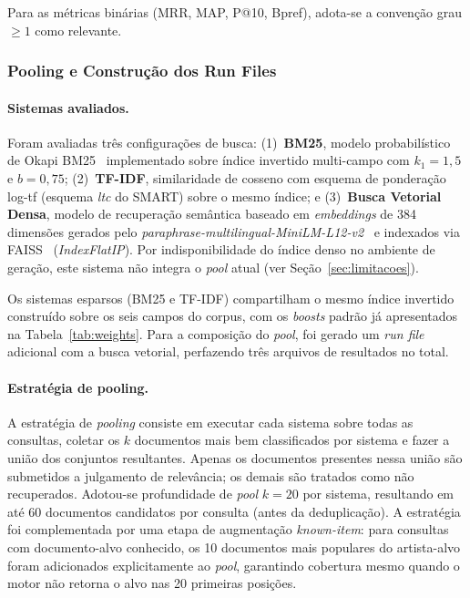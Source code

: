 \documentclass[12pt]{article}
\begin{document}
Para as métricas binárias (MRR, MAP, P@10, Bpref), adota-se a convenção
grau $\geq 1$ como relevante.

\subsubsection{Pooling e Construção dos Run Files}

\paragraph{Sistemas avaliados.} Foram avaliadas três configurações de busca:
(1)~\textbf{BM25}, modelo probabilístico de Okapi BM25~\cite{robertson1994okapi}
implementado sobre índice invertido multi-campo com $k_1 = 1{,}5$ e $b = 0{,}75$;
(2)~\textbf{TF-IDF}, similaridade de cosseno com esquema de ponderação log-tf
(esquema \textit{ltc} do SMART) sobre o mesmo índice; e
(3)~\textbf{Busca Vetorial Densa}, modelo de recuperação semântica baseado em
\textit{embeddings} de 384 dimensões gerados pelo
\textit{paraphrase-multilingual-MiniLM-L12-v2}~\cite{reimers2019sentence} e
indexados via FAISS~\cite{johnson2021billion} (\textit{IndexFlatIP}). Por
indisponibilidade do índice denso no ambiente de geração, este sistema não
integra o \textit{pool} atual (ver Seção~\ref{sec:limitacoes}).

Os sistemas esparsos (BM25 e TF-IDF) compartilham o mesmo índice invertido
construído sobre os seis campos do corpus, com os \textit{boosts} padrão já
apresentados na Tabela~\ref{tab:weights}. Para a composição do \textit{pool},
foi gerado um \textit{run file} adicional com a busca vetorial, perfazendo três
arquivos de resultados no total.

\paragraph{Estratégia de pooling.} A estratégia de
\textit{pooling} consiste em executar cada sistema
sobre todas as consultas, coletar os $k$ documentos mais bem classificados por
sistema e fazer a união dos conjuntos resultantes. Apenas os documentos
presentes nessa união são submetidos a julgamento de relevância; os demais são
tratados como não recuperados. Adotou-se profundidade de \textit{pool} $k = 20$
por sistema, resultando em até 60 documentos candidatos por consulta (antes da
deduplicação). A estratégia foi complementada por uma etapa de augmentação
\textit{known-item}: para consultas com documento-alvo conhecido, os 10
documentos mais populares do artista-alvo foram adicionados explicitamente ao
\textit{pool}, garantindo cobertura mesmo quando o motor não retorna o alvo nas
20 primeiras posições.
\end{document}
